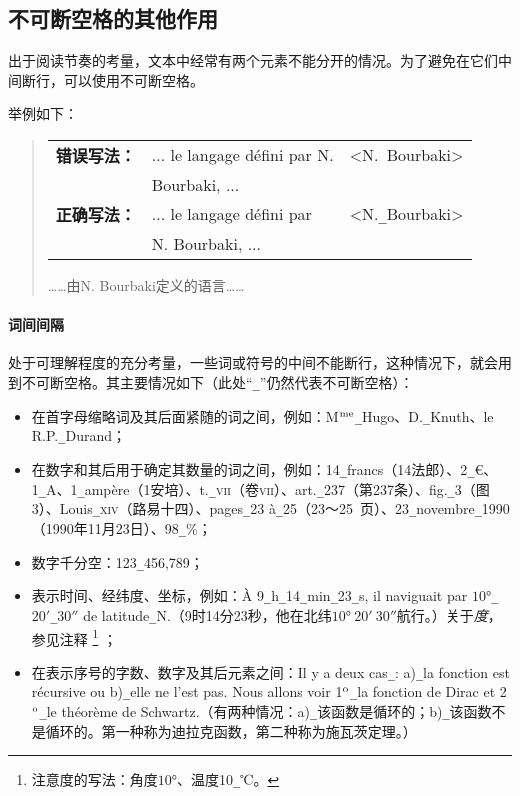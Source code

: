 \subsection{不可断空格的其他作用}\label{sec5.1.3}

出于阅读节奏的考量，文本中经常有两个元素不能分开的情况。为了避免在它们中间断行，可以使用不可断空格。

举例如下：

\begin{quote}
    \begin{tabular}{lll}
        \textbf{错误写法：} & ... le langage défini par N. & <N.\verb*+ +Bourbaki> \\
        & Bourbaki, ... & \\
        \textbf{正确写法：} & ... le langage défini par & <N.\verb|_|Bourbaki>\\
        & N. Bourbaki, ... & \\
    \end{tabular}

    \begin{bil}
        ……由N. Bourbaki定义的语言……
    \end{bil}
\end{quote}

\paragraph*{词间间隔} 处于可理解程度的充分考量，一些词或符号的中间不能断行，这种情况下，就会用到不可断空格。其主要情况如下（此处``\verb|_|''仍然代表不可断空格）：

\begin{itemize}
    \item 在首字母缩略词及其后面紧随的词之间，例如：M$^{\rm me}$\verb|_|Hugo、D.\verb|_|Knuth、le \linebreak R.P.\verb|_|Durand；
    \item 在数字和其后用于确定其数量的词之间，例如：14\verb|_|francs（14法郎）、2\verb|_|€、1\verb|_|A、1\verb|_|ampère（1安培）、t.\verb|_|\textsc{vii}（卷\textsc{vii}）、art.\verb|_|237（第237条）、fig.\verb|_|3（图3）、Louis\verb|_|\textsc{xiv}（路易十四）、pages\verb|_|23 à\verb|_|25（23～25~页）、23\verb|_|novembre\verb|_|1990（1990年11月23日）、98\verb|_|\%；
    \item 数字千分空：123\verb|_|456,789；
    \item 表示时间、经纬度、坐标，例如：À 9\verb|_|h\verb|_|14\verb|_|min\verb|_|23\verb|_|s, il naviguait par $10°$\verb|_|$20'$\verb|_|$30''$ de latitude\verb|_|N.（9时14分23秒，他在北纬$10°\ 20'\ 30''$航行。）关于\emph{度}，参见注释
        \footnote{注意度的写法：角度$10°$、温度10\texttt{\_}℃。}
    ；
    \item 在表示序号的字数、数字及其后元素之间：Il y a deux cas\verb|_|: a)\verb|_|la fonction est récursive ou b)\verb|_|elle ne l'est pas. Nous allons voir 1$^{\rm o}$\verb|_|la fonction de Dirac et 2$^{\rm o}$\verb|_|le théorème de Schwartz.（有两种情况：a)\verb|_|该函数是循环的；b)\verb|_|该函数不是循环的。第一种称为迪拉克函数，第二种称为施瓦茨定理。）
\end{itemize}

